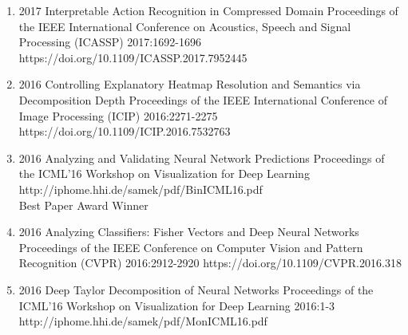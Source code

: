 {\begin{enumerate}
        \item {}
                                {2017}
                                {Interpretable Action Recognition in Compressed Domain}
                                {Proceedings of the IEEE International Conference on Acoustics, Speech and Signal Processing (ICASSP)}
                                {2017:1692-1696}
                                {https://doi.org/10.1109/ICASSP.2017.7952445}


        \item {}
                                {2016}
                                {Controlling Explanatory Heatmap Resolution and Semantics via Decomposition Depth}
                                {Proceedings of the IEEE International Conference of Image Processing (ICIP)}
                                {2016:2271-2275}
                                {https://doi.org/10.1109/ICIP.2016.7532763}


        \item {}
                                {2016}
                                {Analyzing and Validating Neural Network Predictions}
                                {Proceedings of the ICML'16 Workshop on Visualization for Deep Learning}
                                {}
                                {http://iphome.hhi.de/samek/pdf/BinICML16.pdf}
                                {\\Best Paper Award Winner}

        \item {}
                                {2016}
                                {Analyzing Classifiers: Fisher Vectors and Deep Neural Networks}
                                {Proceedings of the IEEE Conference on Computer Vision and Pattern Recognition (CVPR)}
                                {2016:2912-2920}
                                {https://doi.org/10.1109/CVPR.2016.318}

        \item {}
                                {2016}
                                {Deep Taylor Decomposition of Neural Networks}
                                {Proceedings of the ICML'16 Workshop on Visualization for Deep Learning}
                                {2016:1-3}
                                {http://iphome.hhi.de/samek/pdf/MonICML16.pdf}


\end{enumerate}}
